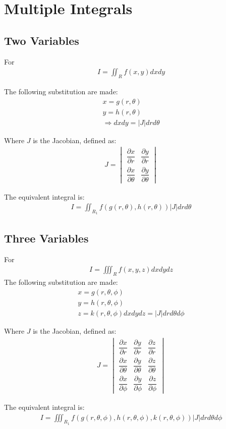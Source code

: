 \documentclass[../main.tex]{subfile}
\begin{document}
\chapter{Multiple Integrals}
\section{Two Variables}
For
\begin{align}
    I = \iint_R f(x,y) dxdy
\end{align}

The following substitution are made:
\begin{align}
    x = g(r,\theta)\\
    y = h(r,\theta)\\
    \Rightarrow dx dy = \lvert J \rvert dr d\theta
\end{align}

Where $J$ is the Jacobian, defined as:
\begin{align}
    J = \begin{vmatrix}
            \dfrac{\partial x}{\partial r} & \dfrac{\partial y}{\partial r}\\[9pt]
            \dfrac{\partial x}{\partial \theta} & \dfrac{\partial y}{\partial \theta}
        \end{vmatrix}
\end{align}

The equivalent integral is:
\begin{align}
    I=\iint_{R_1} f(g(r,\theta),h(r,\theta))\lvert J \rvert drd\theta
\end{align}

\section{Three Variables}
For
\begin{align}
    I=\iiint_R f(x,y,z) dxdydz
\end{align}
The following substitution are made:
\begin{align}
    x = g(r,\theta,\phi)\\
    y = h(r,\theta,\phi)\\
    z = k(r,\theta,\phi)
    dx dy dz = \lvert J \rvert dr d\theta d\phi
\end{align}

Where $J$ is the Jacobian, defined as:
\begin{align}
    J = \begin{vmatrix}
            \dfrac{\partial x}{\partial r}&\dfrac{\partial y}{\partial r}&\dfrac{\partial z}{\partial r}\\[9pt]
            \dfrac{\partial x}{\partial \theta}&\dfrac{\partial y}{\partial \theta}&\dfrac{\partial z}{\partial \theta}\\[9pt]
            \dfrac{\partial x}{\partial \phi}&\dfrac{\partial y}{\partial \phi}&\dfrac{\partial z}{\partial \phi}
        \end{vmatrix}
\end{align}

The equivalent integral is:
\begin{align}
    I=\iiint_{R_1} f(g(r,\theta,\phi),h(r,\theta,\phi),k(r,\theta,\phi))\lvert J \rvert dr d\theta d\phi
\end{align}
\end{document}
